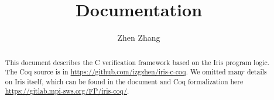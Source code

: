 \documentclass[10pt]{article}
\title{\bfseries \irisc{} Documentation}
\author{Zhen Zhang}
\begin{document}
\maketitle
\thispagestyle{empty}
\vfill
\begin{abstract}
  This document describes the C verification framework based on the Iris program logic.
  The Coq source is in \url{https://github.com/izgzhen/iris-c-coq}.
  We omitted many details on Iris itself,
  which can be found in the document and Coq formalization here \url{https://gitlab.mpi-sws.org/FP/iris-coq/}.
\end{abstract}

\clearpage
\tableofcontents
\clearpage

\begingroup

\endgroup
\clearpage

\begingroup

\endgroup
\clearpage

\begingroup

\endgroup
\clearpage


\begingroup

\endgroup
\clearpage

\begingroup

\endgroup
\clearpage

\begingroup

\endgroup
\clearpage
\end{document}
